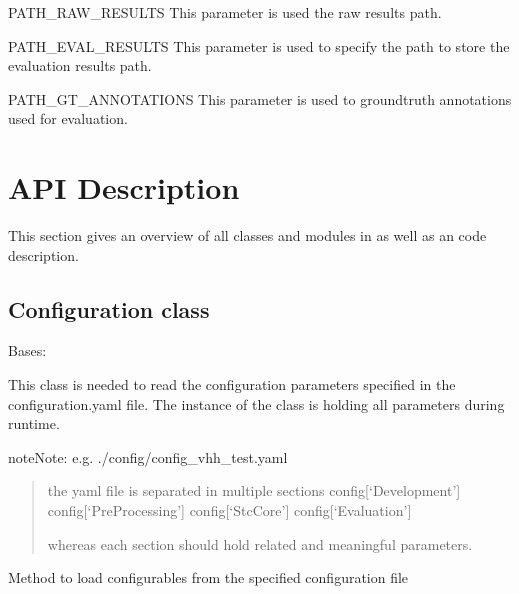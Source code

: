 \documentclass[letterpaper,10pt,english,openany,oneside]{sphinxmanual}
\begin{document}
PATH\_RAW\_RESULTS
This parameter is used the raw results path.



PATH\_EVAL\_RESULTS
This parameter is used to specify the path to store the evaluation results path.



PATH\_GT\_ANNOTATIONS
This parameter is used to groundtruth annotations used for evaluation.




\chapter{API Description}
\label{\detokenize{index:api-description}}
This section gives an overview of all classes and modules in  as well as an code description.


\section{Configuration class}
\label{\detokenize{Configuration:configuration-class}}\label{\detokenize{Configuration::doc}}

\begin{fulllineitems}
\label{\detokenize{Configuration:stc.Configuration.Configuration}}
Bases: 

This class is needed to read the configuration parameters specified in the configuration.yaml file.
The instance of the class is holding all parameters during runtime.

\begin{sphinxadmonition}{note}{Note:}
e.g. ./config/config\_vhh\_test.yaml
\begin{quote}

the yaml file is separated in multiple sections
config{[}‘Development’{]}
config{[}‘PreProcessing’{]}
config{[}‘StcCore’{]}
config{[}‘Evaluation’{]}

whereas each section should hold related and meaningful parameters.
\end{quote}
\end{sphinxadmonition}

\begin{fulllineitems}
\label{\detokenize{Configuration:stc.Configuration.Configuration.loadConfig}}
Method to load configurables from the specified configuration file

\end{fulllineitems}


\end{fulllineitems}
\end{document}
